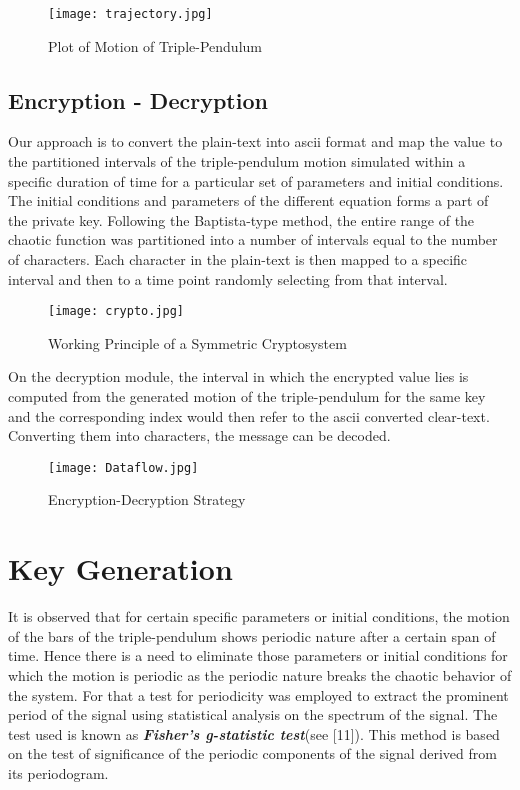 \begin{figure}[H]
\centering
\texttt{[image: trajectory.jpg]}
\caption{Plot of Motion of Triple-Pendulum}\label{fig:trajectory}
\end{figure}


\subsection{Encryption - Decryption}
Our approach is to convert the plain-text into ascii format and  map the value to the partitioned intervals of the triple-pendulum motion simulated within a specific duration of time for a particular set of parameters and initial conditions. The initial conditions and parameters of the different equation forms a part of the private key. Following the Baptista-type method, the entire range of the chaotic function was partitioned into a number of intervals equal to the number of characters. Each character in the plain-text is then mapped to a specific interval and then to a time point randomly selecting from that interval.  

\begin{figure}[H]
\centering
\texttt{[image: crypto.jpg]}
\caption{Working Principle of a Symmetric Cryptosystem}\label{fig:crypto}
\end{figure}

On the decryption module, the interval in which the encrypted value lies is computed from the generated motion of the triple-pendulum for the same key and the corresponding index would then refer to the ascii converted clear-text. Converting them into characters, the message can be decoded.\\
\begin{figure}[H]
\centering
\texttt{[image: Dataflow.jpg]}
\caption{Encryption-Decryption Strategy}\label{fig:Dataflow}
\end{figure}


\section{Key Generation}
It is observed that for certain specific parameters or initial conditions, the motion of the bars of the triple-pendulum shows periodic nature after a certain span of time. Hence there is a need to eliminate those parameters or initial conditions for which the motion is periodic as the periodic nature breaks the chaotic behavior of the system. For that a test for periodicity was employed to extract the prominent period of the signal using statistical analysis on the spectrum of the signal. The test used is known as {\bf{\em Fisher's g-statistic test}}(see [11]). This method is based on the test of significance of the periodic components of the signal derived from its periodogram. 

